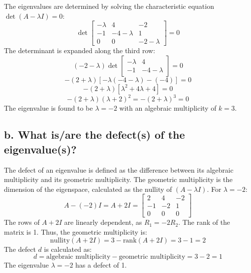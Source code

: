 \begin{enumerate}
  The eigenvalues are determined by solving the characteristic equation $\det(A - \lambda I) = 0$:
  \[
  \det \begin{bmatrix} 
  -\lambda & 4 & -2 \\ 
  -1 & -4-\lambda & 1 \\ 
  0 & 0 & -2-\lambda 
  \end{bmatrix} = 0
  \]
  The determinant is expanded along the third row:
  \[
  (-2 - \lambda) \det \begin{bmatrix} 
  -\lambda & 4 \\ 
  -1 & -4-\lambda 
  \end{bmatrix} = 0
  \]
  \[
  -(2 + \lambda) [-\lambda(-4 - \lambda) - (-4)] = 0
  \]
  \[
  -(2 + \lambda) [\lambda^2 + 4\lambda + 4] = 0
  \]
  \[
  -(2 + \lambda) (\lambda + 2)^2 = -(2 + \lambda)^3 = 0
  \]
  The eigenvalue is found to be $\lambda = -2$ with an algebraic multiplicity of $k = 3$.

  \subsection*{b. What is/are the defect(s) of the eigenvalue(s)?}

  The defect of an eigenvalue is defined as the difference between its algebraic multiplicity and its geometric multiplicity. The geometric multiplicity is the dimension of the eigenspace, calculated as the nullity of $(A - \lambda I)$. For $\lambda = -2$:
  \[
  A - (-2)I = A + 2I = \begin{bmatrix} 
  2 & 4 & -2 \\ 
  -1 & -2 & 1 \\ 
  0 & 0 & 0 
  \end{bmatrix}
  \]
  The rows of $A + 2I$ are linearly dependent, as $R_1 = -2R_2$. The rank of the matrix is 1. Thus, the geometric multiplicity is:
  \[
  \text{nullity}(A + 2I) = 3 - \text{rank}(A + 2I) = 3 - 1 = 2
  \]
  The defect $d$ is calculated as:
  \[
  d = \text{algebraic multiplicity} - \text{geometric multiplicity} = 3 - 2 = 1
  \]
  The eigenvalue $\lambda = -2$ has a defect of 1.


\end{enumerate}
